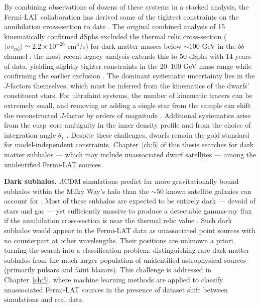 By combining observations of dozens of these systems in a stacked analysis, the Fermi-LAT collaboration has derived some of the tightest constraints on the annihilation cross-section to date \cite{Fermi-LAT:2015att,2024PhRvD.109f3024M,Hooper:2024}.
The original combined analysis of 15 kinematically confirmed dSphs excluded the thermal relic cross-section ($\langle \sigma v_\text{rel} \rangle \simeq 2.2 \times 10^{-26}$ cm$^3$/s) for dark matter masses below $\sim 100$ GeV in the $b\bar{b}$ channel \cite{Fermi-LAT:2015att}; the most recent legacy analysis extends this to 50 dSphs with 14 years of data, yielding slightly tighter constraints in the 20--100 GeV mass range while confirming the earlier exclusion \cite{2024PhRvD.109f3024M}.
The dominant systematic uncertainty lies in the $J$-factors themselves, which must be inferred from the kinematics of the dwarfs' constituent stars.
For ultrafaint systems, the number of kinematic tracers can be extremely small, and removing or adding a single star from the sample can shift the reconstructed $J$-factor by orders of magnitude \cite{Cirelli:2024ssz}.
Additional systematics arise from the cusp--core ambiguity in the inner density profile and from the choice of integration angle $\theta_\star$ \cite{Cirelli:2024ssz}.
Despite these challenges, dwarfs remain the gold standard for model-independent constraints.
Chapter~\ref{ch:5} of this thesis searches for dark matter subhalos --- which may include unassociated dwarf satellites --- among the unidentified Fermi-LAT sources.

\textbf{Dark subhalos.} $\Lambda$CDM simulations predict far more gravitationally bound subhalos within the Milky Way's halo than the $\sim 50$ known satellite galaxies can account for \cite{Cirelli:2024ssz}.
Most of these subhalos are expected to be entirely dark --- devoid of stars and gas --- yet sufficiently massive to produce a detectable gamma-ray flux if the annihilation cross-section is near the thermal relic value \cite{Cirelli:2024ssz}.
Such dark subhalos would appear in the Fermi-LAT data as unassociated point sources with no counterpart at other wavelengths.
Their positions are unknown a priori, turning the search into a classification problem: distinguishing rare dark matter subhalos from the much larger population of unidentified astrophysical sources (primarily pulsars and faint blazars).
This challenge is addressed in Chapter~\ref{ch:5}, where machine learning methods are applied to classify unassociated Fermi-LAT sources in the presence of dataset shift between simulations and real data.

